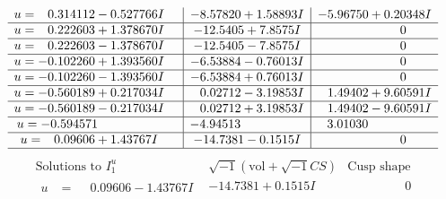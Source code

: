 \documentclass[1p]{elsarticle_modified}
\theoremstyle{definition}
\newcommand{\I}{\sqrt{-1}}
\begin{document}
$$\begin{array}{c|c|c}
\begin{aligned}
u &= \phantom{-}0.314112 - 0.527766 I\end{aligned}
 & -8.57820 + 1.58893 I & -5.96750 + 0.20348 I \\ \hline\begin{aligned}
u &= \phantom{-}0.222603 + 1.378670 I\end{aligned}
 & -12.5405 + 7.8575 I & \phantom{-0.000000 } 0 \\ \hline\begin{aligned}
u &= \phantom{-}0.222603 - 1.378670 I\end{aligned}
 & -12.5405 - 7.8575 I & \phantom{-0.000000 } 0 \\ \hline\begin{aligned}
u &= -0.102260 + 1.393560 I\end{aligned}
 & -6.53884 - 0.76013 I & \phantom{-0.000000 } 0 \\ \hline\begin{aligned}
u &= -0.102260 - 1.393560 I\end{aligned}
 & -6.53884 + 0.76013 I & \phantom{-0.000000 } 0 \\ \hline\begin{aligned}
u &= -0.560189 + 0.217034 I\end{aligned}
 & \phantom{-}0.02712 - 3.19853 I & \phantom{-}1.49402 + 9.60591 I \\ \hline\begin{aligned}
u &= -0.560189 - 0.217034 I\end{aligned}
 & \phantom{-}0.02712 + 3.19853 I & \phantom{-}1.49402 - 9.60591 I \\ \hline\begin{aligned}
u &= -0.594571\phantom{ +0.000000I}\end{aligned}
 & -4.94513\phantom{ +0.000000I} & \phantom{-}3.01030\phantom{ +0.000000I} \\ \hline\begin{aligned}
u &= \phantom{-}0.09606 + 1.43767 I\end{aligned}
 & -14.7381 - 0.1515 I & \phantom{-0.000000 } 0\\
 \hline 
 \end{array}$$\newpage$$\begin{array}{c|c|c}  
\text{Solutions to }I^u_{1}& \I (\text{vol} + \sqrt{-1}CS) & \text{Cusp shape}\\
 \hline 
\begin{aligned}
u &= \phantom{-}0.09606 - 1.43767 I\end{aligned}
 & -14.7381 + 0.1515 I & \phantom{-0.000000 } 0 \\ \hline\begin{aligned}

\end{aligned}
\end{array}$$
\end{document}
